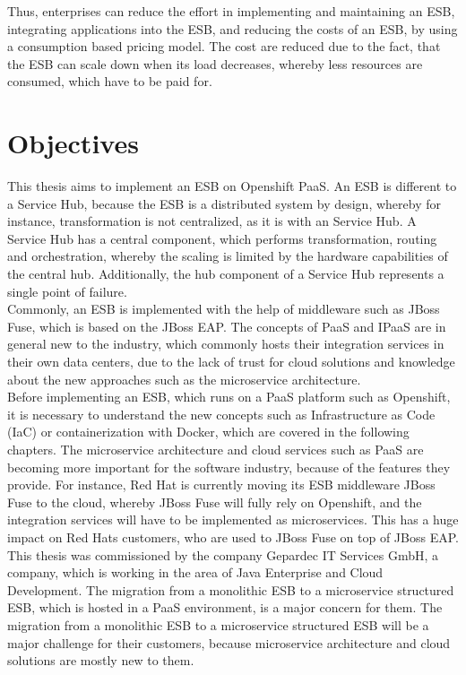 Thus, enterprises can reduce the effort in implementing and maintaining an ESB, integrating applications into the ESB, and reducing the costs of an ESB, by using a consumption based pricing model. The cost are reduced due to the fact, that the ESB can scale down when its load decreases, whereby less resources are consumed, which have to be paid for.

\section{Objectives}
\label{sec:intro-objectives}
This thesis aims to implement an ESB on Openshift PaaS. An ESB is different to a Service Hub, because the ESB is a distributed system by design, whereby for instance, transformation is not centralized, as it is with an Service Hub. A Service Hub has a central component, which performs transformation, routing and orchestration, whereby the scaling is limited by the hardware capabilities of the central hub. Additionally, the hub component of a Service Hub represents a single point of failure\cite{EIP}. \\

Commonly, an ESB is implemented with the help of middleware such as JBoss Fuse, which is based on the JBoss EAP. The concepts of PaaS and IPaaS are in general new to the industry, which commonly hosts their integration services in their own data centers, due to the lack of trust for cloud solutions and knowledge about the new approaches such as the microservice architecture\cite{Openshift2018}. \\

Before implementing an ESB, which runs on a PaaS platform such as Openshift, it is necessary to understand the new concepts such as Infrastructure as Code (IaC) or containerization with Docker, which are covered in the following chapters. The microservice architecture and cloud services such as PaaS are becoming more important for the software industry, because of the features they provide. For instance, Red Hat is currently moving its ESB middleware JBoss Fuse to the cloud, whereby JBoss Fuse will fully rely on Openshift, and the integration services will have to be implemented as microservices. This has a huge impact on Red Hats customers, who are used to JBoss Fuse on top of JBoss EAP. \\

This thesis was commissioned by the company Gepardec IT Services GmbH, a company, which is working in the area of Java Enterprise and Cloud Development. The migration from a monolithic ESB to a microservice structured ESB, which is hosted in a PaaS environment, is a major concern for them. The migration from a monolithic ESB to a microservice structured ESB will be a major challenge for their customers, because microservice architecture and cloud solutions are mostly new to them.  \\

